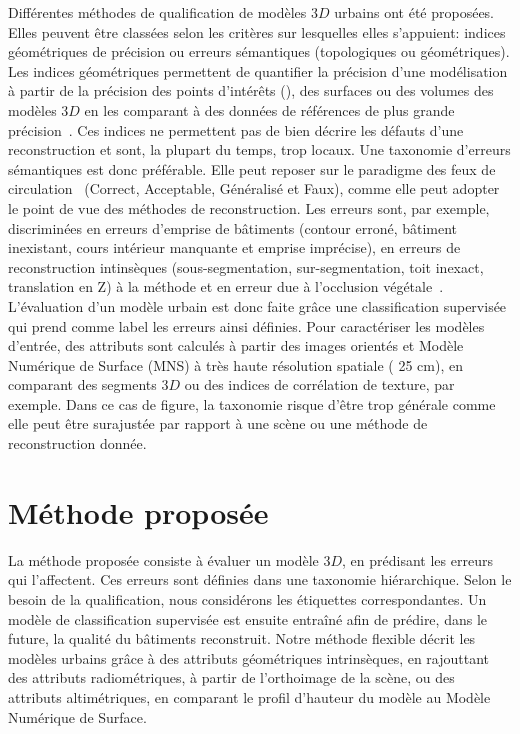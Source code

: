 \documentclass[a4paper,french]{article}
\begin{document}
    Différentes méthodes de qualification de modèles $3D$ urbains ont été proposées. Elles peuvent être classées selon les critères sur lesquelles elles s'appuient: indices géométriques de précision ou erreurs sémantiques (topologiques ou géométriques). Les indices géométriques permettent de quantifier la précision d'une modélisation à partir de la précision des points d'intérêts (), des surfaces ou des volumes des modèles $3D$ en les comparant à des données de références de plus grande précision~\cite{Zeng2014}. Ces indices ne permettent pas de bien décrire les défauts d'une reconstruction et sont, la plupart du temps, trop locaux. Une taxonomie d'erreurs sémantiques est donc préférable. Elle peut reposer sur le paradigme des feux de circulation~\cite{Boudet2006} (Correct, Acceptable, Généralisé et Faux), comme elle peut adopter le point de vue des méthodes de reconstruction. Les erreurs sont, par exemple, discriminées en erreurs d'emprise de bâtiments (contour erroné, bâtiment inexistant, cours intérieur manquante et emprise imprécise), en erreurs de reconstruction intinsèques (sous-segmentation, sur-segmentation, toit inexact, translation en Z) à la méthode et en erreur due à l'occlusion végétale~\cite{Michelin2013}. L'évaluation d'un modèle urbain est donc faite grâce une classification supervisée qui prend comme label les erreurs ainsi définies. Pour caractériser les modèles d'entrée, des attributs sont calculés à partir des images orientés et Modèle Numérique de Surface (MNS) à très haute résolution spatiale ( 25 cm), en comparant des segments $3D$ ou des indices de corrélation de texture, par exemple. Dans ce cas de figure, la taxonomie risque d'être trop générale comme elle peut être surajustée par rapport à une scène ou une méthode de reconstruction donnée.

    \section{Méthode proposée}

    La méthode proposée consiste à évaluer un modèle $3D$, en prédisant les erreurs qui l'affectent. Ces erreurs sont définies dans une taxonomie hiérarchique. Selon le besoin de la qualification, nous considérons les étiquettes correspondantes. Un modèle de classification supervisée est ensuite entraîné afin de prédire, dans le future, la qualité du bâtiments reconstruit. Notre méthode flexible décrit les modèles urbains grâce à des attributs géométriques intrinsèques, en rajouttant des attributs radiométriques, à partir de l'orthoimage de la scène, ou des attributs altimétriques, en comparant le profil d'hauteur du modèle au Modèle Numérique de Surface.
\end{document}
